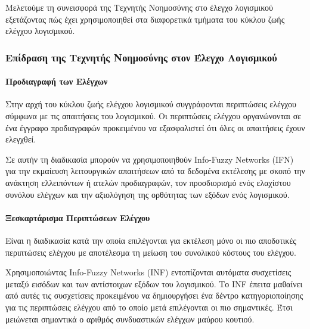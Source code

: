 \documentclass[12pt]{article}
\begin{document}
\par Μελετούμε τη συνεισφορά της Τεχνητής Νοημοσύνης στο έλεγχο λογισμικού εξετάζοντας πώς έχει χρησιμοποιηθεί στα διαφορετικά τμήματα του κύκλου ζωής ελέγχου λογισμικού.

\subsubsection{Επίδραση της Τεχνητής Νοημοσύνης στον Έλεγχο Λογισμικού} 


\paragraph{Προδιαγραφή των Ελέγχων}
Στην αρχή του κύκλου ζωής ελέγχου λογισμικού συγγράφονται περιπτώσεις ελέγχου σύμφωνα με τις απαιτήσεις του λογισμικού. Οι περιπτώσεις ελέγχου οργανώνονται σε ένα έγγραφο προδιαγραφών προκειμένου να εξασφαλιστεί ότι όλες οι απαιτήσεις έχουν ελεγχθεί.
\par Σε αυτήν τη διαδικασία μπορούν να χρησιμοποιηθούν Info-Fuzzy Networks (IFN) για την εκμαίευση λειτουργικών απαιτήσεων από τα δεδομένα εκτέλεσης με σκοπό την ανάκτηση ελλειπόντων ή ατελών προδιαγραφών, τον προσδιορισμό ενός ελαχίστου συνόλου ελέγχων και την αξιολόγηση της ορθότητας των εξόδων ενός λογισμικού.\cite{zubair}

\paragraph{Ξεσκαρτάρισμα Περιπτώσεων Ελέγχου}
Είναι η διαδικασία κατά την οποία επιλέγονται για εκτέλεση μόνο οι πιο αποδοτικές περιπτώσεις ελέγχου με αποτέλεσμα τη μείωση του συνολικού κόστους του ελέγχου.
\par Χρησιμοποιώντας Info-Fuzzy Networks (INF) εντοπίζονται αυτόματα συσχετίσεις μεταξύ εισόδων και των αντίστοιχων εξόδων του λογισμικού. Το INF έπειτα μαθαίνει από αυτές τις συσχετίσεις προκειμένου να δημιουργήσει ένα δέντρο κατηγοριοποίησης για τις περιπτώσεις ελέγχου από το οποίο μετά επιλέγονται οι πιο σημαντικές. Έτσι μειώνεται σημαντικά ο αριθμός συνδυαστικών ελέγχων μαύρου κουτιού.
\end{document}
